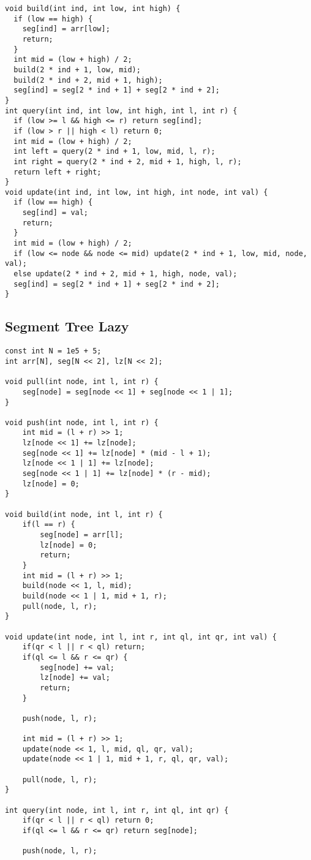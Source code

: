 \documentclass[10pt, a4paper]{article}
\begin{document}
\begin{multicols}{2}
\begin{lstlisting}
void build(int ind, int low, int high) {
  if (low == high) {
    seg[ind] = arr[low];
    return;
  }
  int mid = (low + high) / 2;
  build(2 * ind + 1, low, mid);
  build(2 * ind + 2, mid + 1, high);
  seg[ind] = seg[2 * ind + 1] + seg[2 * ind + 2];
}
int query(int ind, int low, int high, int l, int r) {
  if (low >= l && high <= r) return seg[ind];
  if (low > r || high < l) return 0;
  int mid = (low + high) / 2;
  int left = query(2 * ind + 1, low, mid, l, r);
  int right = query(2 * ind + 2, mid + 1, high, l, r);
  return left + right;
}
void update(int ind, int low, int high, int node, int val) {
  if (low == high) {
    seg[ind] = val;
    return;
  }
  int mid = (low + high) / 2;
  if (low <= node && node <= mid) update(2 * ind + 1, low, mid, node, val);
  else update(2 * ind + 2, mid + 1, high, node, val);
  seg[ind] = seg[2 * ind + 1] + seg[2 * ind + 2];
}
\end{lstlisting}
\subsection{Segment Tree Lazy}
\begin{lstlisting}
const int N = 1e5 + 5;
int arr[N], seg[N << 2], lz[N << 2];

void pull(int node, int l, int r) {
	seg[node] = seg[node << 1] + seg[node << 1 | 1];
}

void push(int node, int l, int r) {
	int mid = (l + r) >> 1;
	lz[node << 1] += lz[node];
	seg[node << 1] += lz[node] * (mid - l + 1);
	lz[node << 1 | 1] += lz[node];
	seg[node << 1 | 1] += lz[node] * (r - mid);
	lz[node] = 0;
}

void build(int node, int l, int r) {
	if(l == r) {
		seg[node] = arr[l];
		lz[node] = 0;
		return;
	}
	int mid = (l + r) >> 1;
	build(node << 1, l, mid);
	build(node << 1 | 1, mid + 1, r);
	pull(node, l, r);
}

void update(int node, int l, int r, int ql, int qr, int val) {
	if(qr < l || r < ql) return;
	if(ql <= l && r <= qr) {
		seg[node] += val;
		lz[node] += val;
		return;
	}
	
	push(node, l, r);
	
	int mid = (l + r) >> 1;
	update(node << 1, l, mid, ql, qr, val);
	update(node << 1 | 1, mid + 1, r, ql, qr, val);
	
	pull(node, l, r);
}

int query(int node, int l, int r, int ql, int qr) {
	if(qr < l || r < ql) return 0;
	if(ql <= l && r <= qr) return seg[node];
	
	push(node, l, r);
	

\end{lstlisting}
\end{multicols}
\end{document}
